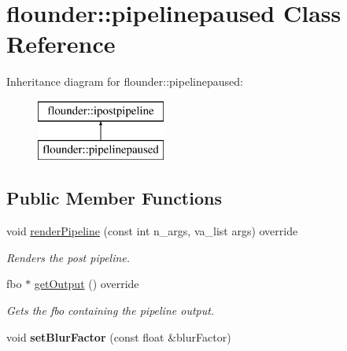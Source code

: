 \hypertarget{classflounder_1_1pipelinepaused}{}\section{flounder\+:\+:pipelinepaused Class Reference}
\label{classflounder_1_1pipelinepaused}
Inheritance diagram for flounder\+:\+:pipelinepaused\+:\begin{figure}[H]
\begin{center}
\leavevmode
\includegraphics[height=2.000000cm]{classflounder_1_1pipelinepaused}
\end{center}
\end{figure}
\subsection*{Public Member Functions}
\begin{DoxyCompactItemize}
\item 
void \hyperlink{classflounder_1_1pipelinepaused_ad524695829a716d4726118c2e6ac43a1}{render\+Pipeline} (const int n\+\_\+args, va\+\_\+list args) override
\begin{DoxyCompactList}\small\item\em Renders the post pipeline. \end{DoxyCompactList}\item 
fbo $\ast$ \hyperlink{classflounder_1_1pipelinepaused_a7824b6364878b5aaf57921e2a7a4915a}{get\+Output} () override
\begin{DoxyCompactList}\small\item\em Gets the fbo containing the pipeline output. \end{DoxyCompactList}\item 
\mbox{\label{classflounder_1_1pipelinepaused_a1e19831a7dfe80d52eb93021cfec88fd}} 
void {\bfseries set\+Blur\+Factor} (const float \&blur\+Factor)
\end{DoxyCompactItemize}
